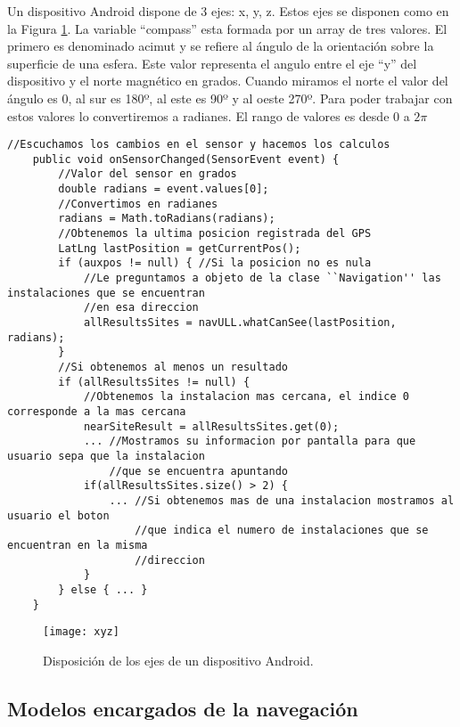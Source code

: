 Un dispositivo Android dispone de 3 ejes: x, y, z. Estos ejes se disponen como en la Figura \ref{fig:xyz}. La variable ``compass'' esta formada por un array de tres valores. El primero es denominado acimut y se refiere al ángulo de la orientación sobre la superficie de una esfera. Este valor representa el angulo entre el eje ``y'' del dispositivo y el norte magnético en grados. Cuando miramos el norte el valor del ángulo es 0, al sur es 180º, al este es 90º y al oeste 270º. Para poder trabajar con estos valores lo convertiremos a radianes.  El rango de valores es desde $0$ a $2\pi$


\begin{lstlisting}[caption={Código que se ejecuta cada vez que se registra un cambio en el sensor que calcula la orientacion.}, label={lst:orientacionL}]
    //Escuchamos los cambios en el sensor y hacemos los calculos
    public void onSensorChanged(SensorEvent event) {
        //Valor del sensor en grados
        double radians = event.values[0]; 
        //Convertimos en radianes
        radians = Math.toRadians(radians);
        //Obtenemos la ultima posicion registrada del GPS
        LatLng lastPosition = getCurrentPos();
        if (auxpos != null) { //Si la posicion no es nula
            //Le preguntamos a objeto de la clase ``Navigation'' las instalaciones que se encuentran
            //en esa direccion
            allResultsSites = navULL.whatCanSee(lastPosition, radians);
        }
        //Si obtenemos al menos un resultado
        if (allResultsSites != null) {
            //Obtenemos la instalacion mas cercana, el indice 0 corresponde a la mas cercana
            nearSiteResult = allResultsSites.get(0);
            ... //Mostramos su informacion por pantalla para que usuario sepa que la instalacion  
                //que se encuentra apuntando
            if(allResultsSites.size() > 2) {
                ... //Si obtenemos mas de una instalacion mostramos al usuario el boton
                    //que indica el numero de instalaciones que se encuentran en la misma
                    //direccion 
            }
        } else { ... }
    }
\end{lstlisting}

\begin{figure}[h]
    \centering
    \texttt{[image: xyz]}
    \caption{Disposición de los ejes de un dispositivo Android.}
    \label{fig:xyz}
\end{figure}    

\subsection{Modelos encargados de la navegación}

